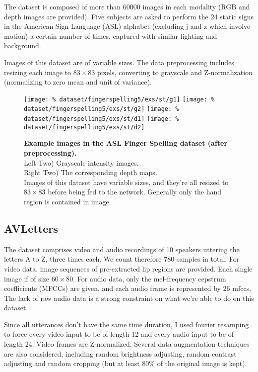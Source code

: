The dataset is composed of more than 60000 images in each modality
(RGB and depth images are provided).
Five subjects are asked to perform the 24 static signs in
the American Sign Language (ASL) alphabet (excluding j and z which involve
motion) a certain number of times, captured with similar lighting
and background.

Images of this dataset are of variable sizes. The data preprocessing
includes resizing each image to $83 \times 83$ pixels,
converting to grayscale and Z-normalization (normailzing to zero mean
and unit of variance).

\begin{figure}[H]
  \centering
  \hfill
  \texttt{[image: \%
    dataset/fingerspelling5/exs/st/g1]}
  \hfill
  \texttt{[image: \%
    dataset/fingerspelling5/exs/st/g2]}
  \hfill
  \texttt{[image: \%
    dataset/fingerspelling5/exs/st/d1]}
  \hfill
  \texttt{[image: \%
    dataset/fingerspelling5/exs/st/d2]}
  \caption{%
    \textbf{Example images in the ASL Finger Spelling dataset
      (after preprocessing).}\\[0.1em]
    Left Two) Grayscale intensity images.\\[0.1em]
    Right Two) The corresponding depth maps.\\[0.1em]
    Images of this dataset have variable sizes, and they're all resized to
      $83 \times 83$ before being fed to the network. Generally only the
      hand region is contained in image.}
  \label{fig:fingerspelling_exs}
\end{figure}

\subsection{AVLetters}

The dataset comprises video and audio recordings of 10 speakers
uttering the letters A to Z, three times each.
We count therefore 780 samples in total. For video data, image sequences
of pre-extracted lip regions are provided.
Each single image if of size $60 \times 80$.
For audio data, only the mel-frequency cepstrum coefficients (MFCCs)
are given, and each audio frame is represented by 26 mfccs.
The lack of raw audio data is a strong constraint on what we're able to do
on this dataset.

Since all utterances don't have the same time duration, I used
fourier resamping to force every video input to be of length 12 and
every audio input to be of length 24. Video frames are Z-normalized.
Several data augmentation techniques
are also considered, including random brightness adjusting, random contrast
adjusting and random cropping (but at least 80\% of the original image
is kept).

